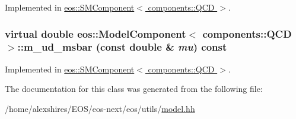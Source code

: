 Implemented in \hyperlink{classeos_1_1SMComponent_3_01components_1_1QCD_01_4_a8c798c65f6fdf75c7f038e428134d026}{eos::SMComponent$<$ components::QCD $>$}.\hypertarget{classeos_1_1ModelComponent_3_01components_1_1QCD_01_4_a75172971f04fdac5927b0512cf77ebe2}{
\subsubsection[{m\_\-ud\_\-msbar}]{\setlength{\rightskip}{0pt plus 5cm}virtual double eos::ModelComponent$<$ components::QCD $>$::m\_\-ud\_\-msbar (const double \& {\em mu}) const}}
\label{classeos_1_1ModelComponent_3_01components_1_1QCD_01_4_a75172971f04fdac5927b0512cf77ebe2}


Implemented in \hyperlink{classeos_1_1SMComponent_3_01components_1_1QCD_01_4_aff5afae1cb8169135ad183db75836529}{eos::SMComponent$<$ components::QCD $>$}.

The documentation for this class was generated from the following file:\begin{DoxyCompactItemize}
\item 
/home/alexshires/EOS/eos-\/next/eos/utils/\hyperlink{model_8hh}{model.hh}\end{DoxyCompactItemize}
